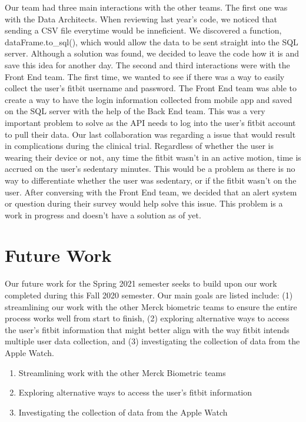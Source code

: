 \documentclass[]{book}
\providecommand{\tightlist}{%
  \setlength{\itemsep}{0pt}\setlength{\parskip}{0pt}}
\begin{document}
Our team had three main interactions with the other teams. The first one
was with the Data Architects. When reviewing last year's code, we
noticed that sending a CSV file everytime would be inneficient. We
discovered a function, dataFrame.to\_sql(), which would allow the data
to be sent straight into the SQL server. Although a solution was found,
we decided to leave the code how it is and save this idea for another
day. The second and third interactions were with the Front End team. The
first time, we wanted to see if there was a way to easily collect the
user's fitbit username and password. The Front End team was able to
create a way to have the login information collected from mobile app and
saved on the SQL server with the help of the Back End team. This was a
very important problem to solve as the API needs to log into the user's
fitbit account to pull their data. Our last collaboration was regarding
a issue that would result in complications during the clinical trial.
Regardless of whether the user is wearing their device or not, any time
the fitbit wasn't in an active motion, time is accrued on the user's
sedentary minutes. This would be a problem as there is no way to
differentiate whether the user was sedentary, or if the fitbit wasn't on
the user. After conversing with the Front End team, we decided that an
alert system or question during their survey would help solve this
issue. This problem is a work in progress and doesn't have a solution as
of yet.

\section{Future Work}\label{future-work}

Our future work for the Spring 2021 semester seeks to build upon our
work completed during this Fall 2020 semester. Our main goals are listed
include: (1) streamlining our work with the other Merck biometric teams
to ensure the entire process works well from start to finish, (2)
exploring alternative ways to access the user's fitbit information that
might better align with the way fitbit intends multiple user data
collection, and (3) investigating the collection of data from the Apple
Watch.

\begin{enumerate}
\def\labelenumi{(\arabic{enumi})}
\tightlist
\item
  Streamlining work with the other Merck Biometric teams
\item
  Exploring alternative ways to access the user's fitbit information
\item
  Investigating the collection of data from the Apple Watch
\end{enumerate}
\end{document}
